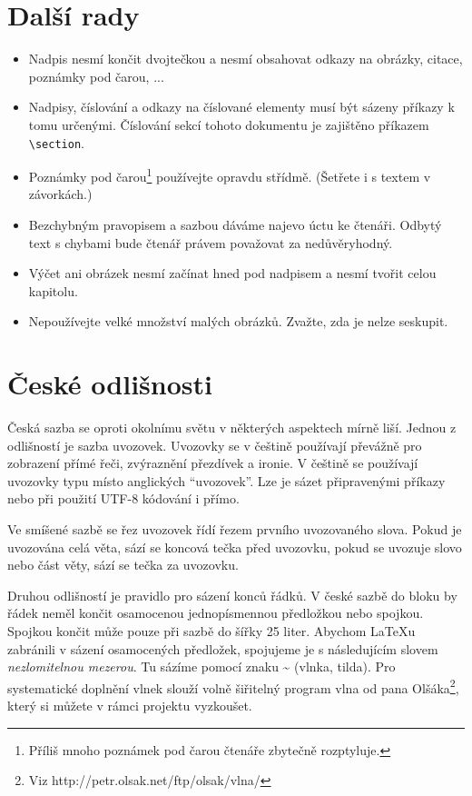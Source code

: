 \documentclass[twocolumn, 10pt]{article}[26.02.2022]
\begin{document}
\section{Další rady}
\label{sec:3}
\begin{itemize}
    \item Nadpis nesmí končit dvojtečkou a nesmí obsahovat odkazy na obrázky, citace, poznámky pod čarou, ...
    \item Nadpisy, číslování a odkazy na číslované elementy musí být sázeny příkazy k tomu určenými. Číslování sekcí tohoto dokumentu je zajištěno příkazem \verb-\section-.
    \item Poznámky pod čarou\footnote{Příliš mnoho poznámek pod čarou čtenáře zbytečně rozptyluje.} používejte opravdu střídmě. (Šetřete i s textem v závorkách.)
    \item Bezchybným pravopisem a sazbou dáváme najevo úctu ke čtenáři. Odbytý text s chybami bude čtenář právem považovat za nedůvěryhodný.
    \item Výčet ani obrázek nesmí začínat hned pod nadpisem a nesmí tvořit celou kapitolu.
    \item Nepoužívejte velké množství malých obrázků. Zvažte, zda je nelze seskupit.
\end{itemize}
\section{České odlišnosti}
Česká sazba se oproti okolnímu světu v některých aspektech mírně liší.
Jednou z odlišností je sazba uvozovek.
Uvozovky se v češtině používají převážně pro zobrazení přímé řeči, zvýraznění přezdívek a ironie.
V češtině se používají uvozovky typu  místo anglických ``uvozovek''.
Lze je sázet připravenými příkazy nebo při použití UTF-8 kódování i přímo.

Ve smíšené sazbě se řez uvozovek řídí řezem prvního uvozovaného slova.
Pokud je uvozována celá věta, sází se koncová tečka před uvozovku, pokud se uvozuje slovo nebo část věty, sází se tečka za uvozovku.

Druhou odlišností je pravidlo pro sázení konců řádků.
V české sazbě do bloku by řádek neměl končit osamocenou jednopísmennou předložkou nebo spojkou.
Spojkou  končit může pouze při sazbě do šířky 25 liter.
Abychom \LaTeX u zabránili v sázení osamocených předložek, spojujeme je s následujícím slovem \textit{nezlomitelnou mezerou}.
Tu sázíme pomocí znaku \~{} (vlnka, tilda).
Pro systematické doplnění vlnek slouží volně šiřitelný program vlna od pana Olšáka\footnote{Viz http://petr.olsak.net/ftp/olsak/vlna/}, který si můžete v rámci projektu vyzkoušet.
\end{document}
